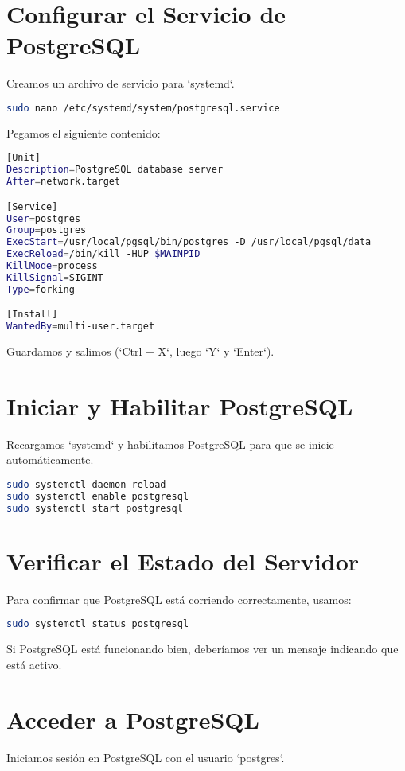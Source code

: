 \documentclass{article}
\begin{document}
\section{Configurar el Servicio de PostgreSQL}
Creamos un archivo de servicio para `systemd`.

\begin{lstlisting}[language=bash]
sudo nano /etc/systemd/system/postgresql.service
\end{lstlisting}

Pegamos el siguiente contenido:

\begin{lstlisting}[language=bash]
[Unit]
Description=PostgreSQL database server
After=network.target

[Service]
User=postgres
Group=postgres
ExecStart=/usr/local/pgsql/bin/postgres -D /usr/local/pgsql/data
ExecReload=/bin/kill -HUP $MAINPID
KillMode=process
KillSignal=SIGINT
Type=forking

[Install]
WantedBy=multi-user.target
\end{lstlisting}

Guardamos y salimos (`Ctrl + X`, luego `Y` y `Enter`).

\section{Iniciar y Habilitar PostgreSQL}
Recargamos `systemd` y habilitamos PostgreSQL para que se inicie automáticamente.

\begin{lstlisting}[language=bash]
sudo systemctl daemon-reload
sudo systemctl enable postgresql
sudo systemctl start postgresql
\end{lstlisting}

\section{Verificar el Estado del Servidor}
Para confirmar que PostgreSQL está corriendo correctamente, usamos:

\begin{lstlisting}[language=bash]
sudo systemctl status postgresql
\end{lstlisting}

Si PostgreSQL está funcionando bien, deberíamos ver un mensaje indicando que está activo.

\section{Acceder a PostgreSQL}
Iniciamos sesión en PostgreSQL con el usuario `postgres`.
\end{document}
